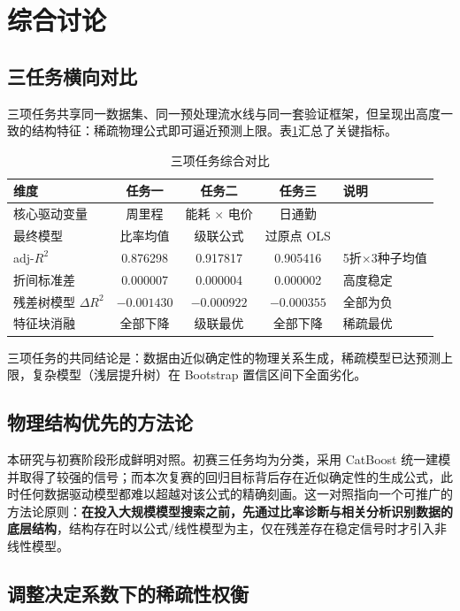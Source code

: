 \section{综合讨论}

\subsection{三任务横向对比}

三项任务共享同一数据集、同一预处理流水线与同一套验证框架，但呈现出高度一致的结构特征：稀疏物理公式即可逼近预测上限。表\ref{tab:overall}汇总了关键指标。

\begin{table}[H]
\centering
\caption{三项任务综合对比}
\label{tab:overall}
\begin{tabular}{lcccl}
\toprule
\textbf{维度} & \textbf{任务一} & \textbf{任务二} & \textbf{任务三} & \textbf{说明} \\
\midrule
核心驱动变量 & 周里程 & 能耗 $\times$ 电价 & 日通勤 & \\
最终模型 & 比率均值 & 级联公式 & 过原点 OLS & \\
adj-$R^2$ & 0.876298 & 0.917817 & 0.905416 & 5折$\times$3种子均值 \\
折间标准差 & 0.000007 & 0.000004 & 0.000002 & 高度稳定 \\
残差树模型 $\Delta R^2$ & $-0.001430$ & $-0.000922$ & $-0.000355$ & 全部为负 \\
特征块消融 & 全部下降 & 级联最优 & 全部下降 & 稀疏最优 \\
\bottomrule
\end{tabular}
\end{table}

三项任务的共同结论是：数据由近似确定性的物理关系生成，稀疏模型已达预测上限，复杂模型（浅层提升树）在 Bootstrap 置信区间下全面劣化。

\subsection{物理结构优先的方法论}

本研究与初赛阶段形成鲜明对照。初赛三任务均为分类，采用 CatBoost 统一建模并取得了较强的信号；而本次复赛的回归目标背后存在近似确定性的生成公式，此时任何数据驱动模型都难以超越对该公式的精确刻画。这一对照指向一个可推广的方法论原则：\textbf{在投入大规模模型搜索之前，先通过比率诊断与相关分析识别数据的底层结构}，结构存在时以公式/线性模型为主，仅在残差存在稳定信号时才引入非线性模型。

\subsection{调整决定系数下的稀疏性权衡}

